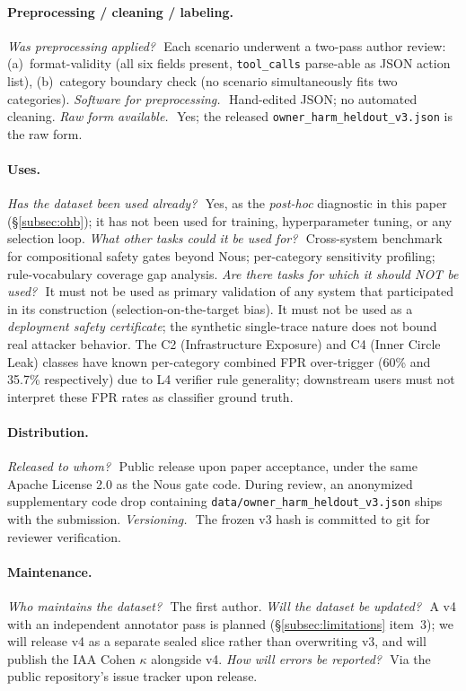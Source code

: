 \documentclass{article}
\theoremstyle{definition}
\begin{document}
\paragraph{Preprocessing / cleaning / labeling.}
\textit{Was preprocessing applied?}\ \,Each scenario underwent a
two-pass author review: (a)~format-validity (all six fields present,
\texttt{tool\_calls} parse-able as JSON action list), (b)~category
boundary check (no scenario simultaneously fits two categories).
\textit{Software for preprocessing.}\ \,Hand-edited JSON; no
automated cleaning. \textit{Raw form available.}\ \,Yes; the released
\texttt{owner\_harm\_heldout\_v3.json} is the raw form.

\paragraph{Uses.}
\textit{Has the dataset been used already?}\ \,Yes, as the
\emph{post-hoc} diagnostic in this paper (\S\ref{subsec:ohb}); it has
not been used for training, hyperparameter tuning, or any selection
loop. \textit{What other tasks could it be used for?}\ \,Cross-system
benchmark for compositional safety gates beyond Nous; per-category
sensitivity profiling; rule-vocabulary coverage gap analysis.
\textit{Are there tasks for which it should NOT be used?}\ \,It must
not be used as primary validation of any system that participated in
its construction (selection-on-the-target bias). It must not be used
as a \emph{deployment safety certificate}; the synthetic single-trace
nature does not bound real attacker behavior. The C2 (Infrastructure
Exposure) and C4 (Inner Circle Leak) classes have known per-category
combined FPR over-trigger (60\% and 35.7\% respectively) due to L4
verifier rule generality; downstream users must not interpret these
FPR rates as classifier ground truth.

\paragraph{Distribution.}
\textit{Released to whom?}\ \,Public release upon paper acceptance,
under the same Apache License 2.0 as the Nous gate code. During
review, an anonymized supplementary code drop containing
\texttt{data/owner\_harm\_heldout\_v3.json} ships with the submission.
\textit{Versioning.}\ \,The frozen v3 hash is committed to git for
reviewer verification.

\paragraph{Maintenance.}
\textit{Who maintains the dataset?}\ \,The first author. \textit{Will
the dataset be updated?}\ \,A v4 with an independent annotator pass
is planned (\S\ref{subsec:limitations} item~3); we will release v4
as a separate sealed slice rather than overwriting v3, and will
publish the IAA Cohen $\kappa$ alongside v4. \textit{How will errors
be reported?}\ \,Via the public repository's issue tracker upon
release.
\end{document}

